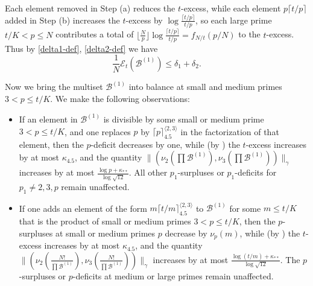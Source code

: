 \documentclass[10pt,a4paper,reqno]{amsart}
\numberwithin{equation}{section}
\theoremstyle{plain}
\theoremstyle{definition}
\newcommand\tuple{{\mathcal B}}
\newcommand\excess{{\mathcal{E}}}
\begin{document}
Each element removed in Step (a) reduces the $t$-excess, while each element $p \lceil t/p \rceil$ added in Step (b) increases the $t$-excess by $\log \frac{\lceil t/p \rceil}{t/p}$, so each large prime $t/K < p \leq N$ contributes a total of $\lfloor \frac{N}{p} \rfloor \log \frac{\lceil t/p \rceil}{t/p} = f_{N/t}(p/N)$ to the $t$-excess.  Thus by \eqref{delta1-def}, \eqref{delta2-def} we have
\begin{equation}\label{excess-1} 
  \frac{1}{N} \excess_t(\tuple^{(1)}) \leq \delta_1 + \delta_2.
\end{equation}

Now we bring the multiset $\tuple^{(1)}$ into balance at small and medium primes $3 < p \leq t/K$.  We make the following observations:
\begin{itemize}
\item[(C)]  If an element in $\tuple^{(1)}$ is divisible by some small or medium prime $3 < p \leq t/K$, and one replaces $p$ by $\lceil p \rceil^{\langle 2,3 \rangle}_{4.5}$ in the factorization of that element, then the $p$-deficit decreases by one, while (by ) the $t$-excess increases by at most $\kappa_{4.5}$, and the quantity $\| (\nu_2(\prod \tuple^{(1)}),\nu_3(\prod \tuple^{(1)}))\|_\gamma$ increases by at most $\frac{\log p + \kappa_{**}}{\log \sqrt{12}}$.  All other $p_1$-surpluses or $p_1$-deficits for $p_1 \neq 2,3,p$ remain unaffected.
\item[(D)]  If one adds an element of the form $m \lceil t/m \rceil^{\langle 2,3 \rangle}_{4.5}$ to $\tuple^{(1)}$ for some $m \leq t/K$ that is the product of small or medium primes $3 < p \leq t/K$, then the $p$-surpluses at small or medium primes $p$ decrease by $\nu_p(m)$, while (by ) the $t$-excess increases by at most $\kappa_{4.5}$, and the quantity $\| (\nu_2(\frac{N!}{\prod \tuple^{(1)}}), \nu_3(\frac{N!}{\prod \tuple^{(1)}}))\|_\gamma$ increases by at most $\frac{\log(t/m) + \kappa_{**}}{\log \sqrt{12}}$.  The $p$-surpluses or $p$-deficits at medium or large primes remain unaffected.
\end{itemize}
\end{document}
